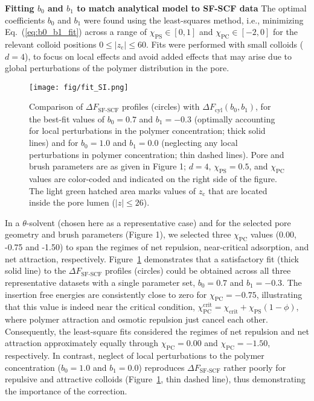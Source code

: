 \documentclass[10pt, a4paper, twocolumn]{article}
\begin{document}
\bigskip\noindent
\textbf{Fitting $b_0$ and $b_1$ to match analytical model to SF-SCF data}
The optimal coefficients $b_0$ and $b_1$ were found using the least-squares method, i.e., minimizing Eq.~(\ref{eq:b0_b1_fit}) across a range of $\chi_{\text{PS}} \in [0,1]$  and $\chi_{\text{PC}} \in [-2,0]$ for the relevant colloid positions $0 \leq |z_{\text{c}}| \leq 60$.
Fits were performed with small colloids ($d=4$), to focus on local effects and avoid added effects that may arise due to global perturbations of the polymer distribution in the pore.

\begin{figure}[]
    \centering
    \texttt{[image: fig/fit\_SI.png]}
    \caption{
    Comparison of $\Delta F_{\text{SF-SCF}}$ profiles (circles) with $\Delta F_{\text{cyl}}(b_0,b_1)$, for the best-fit values of $b_0 = 0.7$ and $b_1 = -0.3$ (optimally accounting for local perturbations in the polymer concentration; thick solid lines) and for $b_0 = 1.0$ and $b_1 = 0.0$ (neglecting any local perturbations in polymer concentration; thin dashed lines).
    Pore and brush parameters are as given in Figure 1; $d = 4$, $\chi_{\text{PS}} = 0.5$, and $\chi_{\text{PC}}$ values are color-coded and indicated on the right side of the figure.
    The light green hatched area marks values of $z_{\text{c}}$ that are located inside the pore lumen ($|z| \leq 26$).
    }
    \label{fig:fit_SI}
\end{figure}

In a $\theta$-solvent (chosen here as a representative case) and for the selected pore geometry and brush parameters (Figure 1), we selected three $\chi_{\text{PC}}$ values (0.00, -0.75 and -1.50) to span the regimes of net repulsion, near-critical adsorption, and net attraction, respectively.
Figure~\ref{fig:fit_SI} demonstrates that a satisfactory fit (thick solid line) to the $\Delta F_{\text{SF-SCF}}$ profiles (circles) could be obtained across all three representative datasets with a single parameter set, $b_0 = 0.7$ and $b_1 = -0.3$.
The insertion free energies are consistently close to zero for $\chi_{\text{PC}} = -0.75$, illustrating that this value is indeed near the critical condition, $\chi_{\text{PC}}^{\text{crit}} = \chi_{\text{crit}} + \chi_{\text{PS}} (1 - \phi)$, where polymer attraction and osmotic repulsion just cancel each other.
Consequently, the least-square fits considered the regimes of net repulsion and net attraction approximately equally through $\chi_{\text{PC}} = 0.00$ and $\chi_{\text{PC}} = -1.50$, respectively.
In contrast, neglect of local perturbations to the polymer concentration ($b_0 = 1.0$ and $b_1 = 0.0$) reproduces $\Delta F_{\text{SF-SCF}}$ rather poorly for repulsive and attractive colloids (Figure~\ref{fig:fit_SI}, thin dashed line), thus demonstrating the importance of the correction.
\end{document}
